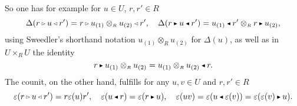 \documentclass[reqno, a4paper, 10pt]{amsart}
\numberwithin{equation}{section}
\theoremstyle{plain}
\theoremstyle{definition}
\theoremstyle{remark}
\begin{document}
So one has for example for $u \in U$, $r, r' \in R$
\begin{equation}
\label{panuelos}
		  \Delta (r {{\,\raise1pt\hbox{$\scriptscriptstyle{\rhd}$} \, }} u {{\,\raise1pt\hbox{$\scriptscriptstyle{\lhd}$} \, }} r')=
		  r {{\,\raise1pt\hbox{$\scriptscriptstyle{\rhd}$} \, }} u_{(1)} \otimes_{{\scriptscriptstyle{R}}} 
		  u_{(2)} {{\,\raise1pt\hbox{$\scriptscriptstyle{\lhd}$} \, }} r',\quad
		  \Delta (r {{\,\raise1pt\hbox{$\scriptscriptstyle{\blacktriangleright}$} \, }} u {{\,\raise1pt\hbox{$\scriptscriptstyle{\blacktriangleleft}$} \, }} r')=
		  u_{(1)} {{\,\raise1pt\hbox{$\scriptscriptstyle{\blacktriangleleft}$} \, }} r' \otimes_{{\scriptscriptstyle{R}}} r {{\,\raise1pt\hbox{$\scriptscriptstyle{\blacktriangleright}$} \, }} u_{(2)},
\end{equation}
using Sweedler's shorthand 
notation 
$u_{(1)} \otimes_{{\scriptscriptstyle{R}}} u_{(2)}$ 
for $\Delta(u)$, as well as in $U \times_{{\scriptscriptstyle{R}}} U$ the identity
\begin{equation}
\label{takinew}
		  r {{\,\raise1pt\hbox{$\scriptscriptstyle{\blacktriangleright}$} \, }} u_{(1)} \otimes_{{\scriptscriptstyle{R}}} u_{(2)} =
		  u_{(1)} \otimes_{{\scriptscriptstyle{R}}} u_{(2)} {{\,\raise1pt\hbox{$\scriptscriptstyle{\blacktriangleleft}$} \, }} r.
\end{equation}
The counit, on the other hand, fulfills for any $u, v \in U$ and $r, r' \in R$
\begin{equation}\label{Eq:counit}
\varepsilon(r {{\,\raise1pt\hbox{$\scriptscriptstyle{\rhd}$} \, }} u {{\,\raise1pt\hbox{$\scriptscriptstyle{\lhd}$} \, }} r') = r\varepsilon(u)r', \quad \varepsilon (u {{\,\raise1pt\hbox{$\scriptscriptstyle{\blacktriangleleft}$} \, }} r) =  \varepsilon(r {{\,\raise1pt\hbox{$\scriptscriptstyle{\blacktriangleright}$} \, }} u), \quad
\varepsilon(uv) = \varepsilon(u {{\,\raise1pt\hbox{$\scriptscriptstyle{\blacktriangleleft}$} \, }} \varepsilon (v)) =   \varepsilon(\varepsilon (v) {{\,\raise1pt\hbox{$\scriptscriptstyle{\blacktriangleright}$} \, }} u).
\end{equation}
\end{document}
